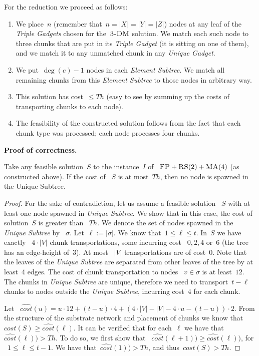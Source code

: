 \documentclass[preprint,12pt]{elsarticle}
\newcommand{\FP}{\textsc{FP}}
\newcommand{\RS}{\textsc{RS}}
\newcommand{\MA}{\textsc{MA}}
\newcommand{\Solution}{S}
\newcommand{\CostSol}{\textit{cost}(\Solution)}
\newcommand{\CostEstimOne}{\widehat{cost}}
\newcommand{\numNodes}{\ensuremath{|V|}}
\newcommand{\UnqSubtree}{{{\emph{Unique Subtree}}}}
\newcommand{\TripleGadget}{{\emph{Triple Gadget}}}
\newcommand{\TripleGadgets}{{\emph{Triple Gadgets}}}
\newcommand{\UnqGadget}{{\emph{Unique Gadget}}}
\newcommand{\SpawnedUnqSubtree}{\sigma}
\newcommand{\TDM}{\textsc{3-DM}}
\newcommand{\Thr}{\ensuremath{Th}}
\begin{document}
For the reduction we proceed as follows:
\begin{enumerate}
  \item We place~$n$ (remember that~$n=|X|=|Y|=|Z|$) nodes at any leaf
  of the {\TripleGadgets} chosen for the~$\TDM$ solution. We
  match each such node to three chunks that are put in its
  {\TripleGadget} (it is sitting on one of them), and we match it to
  any unmatched chunk in any \UnqGadget.
  \item We put~$\deg(e)-1$ nodes in each \emph{Element Subtree}. We match all
  remaining chunks from this \emph{Element Subtree} to those nodes in
  arbitrary way.
  \item This solution has cost~$\leq \Thr$ (easy to see by summing up the
  costs of transporting chunks to each node).
  \item The feasibility of the constructed solution follows from the
  fact that each chunk type was processed; each node processes four
  chunks.
\end{enumerate}

\textbf{Proof of correctness.}
\begin{lemma}
  Take any feasible solution~$\Solution$ to the instance~$I$ of
 ~$\FP+\RS(2)+\MA(4)$ (as constructed above). If the cost of
 ~$\Solution$ is at most~$\Thr$, then no node is spawned in the Unique
  Subtree.
  \label{th:no-unique}
\end{lemma}

\begin{proof}
  For the sake of contradiction, let us assume a feasible solution
 ~$\Solution$ with at least one node spawned in {\UnqSubtree}. We show
  that in this case, the cost of solution~$\Solution$ is greater than
 ~$\Thr$.  We denote the set of nodes spawned in the {\UnqSubtree} by
 ~$\SpawnedUnqSubtree$. Let~$\ell := |\SpawnedUnqSubtree|$. We know
  that~$1 \leq \ell \leq t$.  In~$\Solution$ we have exactly
 ~$4 \cdot \numNodes$ chunk transportations, some incurring cost
 ~$0, 2, 4$ or~$6$ (the tree has an edge-height of~$3$). At most
 ~$\numNodes$ transportations are of cost~$0$. Note that the leaves of the
  {\UnqSubtree} are separated from other leaves of the tree by at
  least~$4$ edges.  The cost of chunk transportation to nodes
 ~$v \in \SpawnedUnqSubtree$ is at least~$12$. The chunks in
  {\UnqSubtree} are unique, therefore we need to transport~$t - \ell$
  chunks to nodes outside the \UnqSubtree, incurring cost~$4$ for each
  chunk.

 
  Let
 ~$\CostEstimOne(u) = u \cdot 12 + (t-u)\cdot 4 + (4\cdot \numNodes -
  \numNodes - 4\cdot u - (t-u))\cdot 2$.
  From the structure of the substrate network and placement of chunks
  we know that~$\CostSol \geq \CostEstimOne(\ell)$.
  It can be verified that for each~$\ell$ we have that
 ~$\CostEstimOne(\ell)) > \Thr$. To do so, we first show that
 ~$\CostEstimOne(\ell+1)) \geq \CostEstimOne(\ell))$, for
 ~$1\leq \ell \leq t-1$. We have that~$\CostEstimOne(1)) > \Thr$, and
  thus~$\CostSol > \Thr$.
\end{proof}
\end{document}
